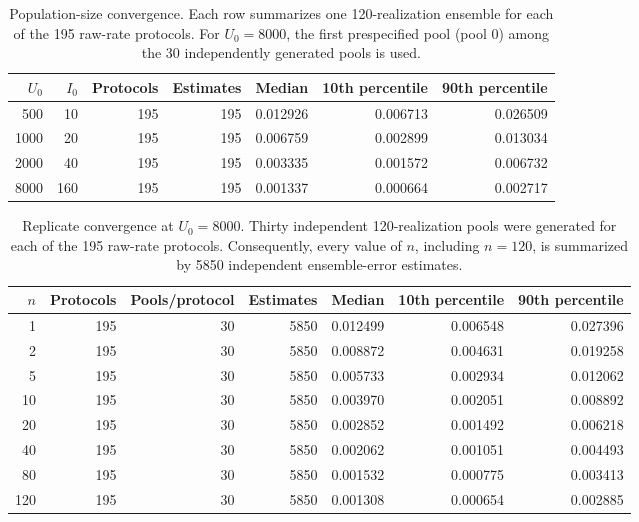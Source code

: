 \documentclass[11pt]{article}
\begin{document}
\begin{table}[H]
\caption{Population-size convergence. Each row summarizes one 120-realization ensemble for each of the 195 raw-rate protocols. For $U_0=8000$, the first prespecified pool (pool 0) among the 30 independently generated pools is used.}
\centering\footnotesize
\begin{tabular}{@{}rrrrrrr@{}}
\toprule
$U_0$ & $I_0$ & Protocols & Estimates & Median & 10th percentile & 90th percentile \\
\midrule
500 & 10 & 195 & 195 & 0.012926 & 0.006713 & 0.026509 \\
1000 & 20 & 195 & 195 & 0.006759 & 0.002899 & 0.013034 \\
2000 & 40 & 195 & 195 & 0.003335 & 0.001572 & 0.006732 \\
8000 & 160 & 195 & 195 & 0.001337 & 0.000664 & 0.002717 \\
\bottomrule
\end{tabular}
\end{table}

\begin{table}[H]
\caption{Replicate convergence at $U_0=8000$. Thirty independent 120-realization pools were generated for each of the 195 raw-rate protocols. Consequently, every value of $n$, including $n=120$, is summarized by 5850 independent ensemble-error estimates.}
\centering\footnotesize
\begin{tabular}{@{}rrrrrrr@{}}
\toprule
$n$ & Protocols & Pools/protocol & Estimates & Median & 10th percentile & 90th percentile \\
\midrule
1 & 195 & 30 & 5850 & 0.012499 & 0.006548 & 0.027396 \\
2 & 195 & 30 & 5850 & 0.008872 & 0.004631 & 0.019258 \\
5 & 195 & 30 & 5850 & 0.005733 & 0.002934 & 0.012062 \\
10 & 195 & 30 & 5850 & 0.003970 & 0.002051 & 0.008892 \\
20 & 195 & 30 & 5850 & 0.002852 & 0.001492 & 0.006218 \\
40 & 195 & 30 & 5850 & 0.002062 & 0.001051 & 0.004493 \\
80 & 195 & 30 & 5850 & 0.001532 & 0.000775 & 0.003413 \\
120 & 195 & 30 & 5850 & 0.001308 & 0.000654 & 0.002885 \\
\bottomrule
\end{tabular}
\end{table}
\end{document}
